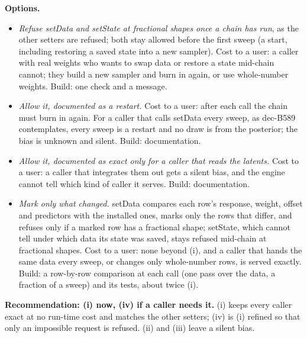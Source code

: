 \textbf{Options.}
\begin{itemize}
\item[(i)] \emph{Refuse setData and setState at fractional shapes once a chain has run}, as the other setters are
refused; both stay allowed before the first sweep (a start, including restoring a saved state into a new
sampler). Cost to a user: a caller with real weights who wants to swap data or restore a state mid-chain cannot;
they build a new sampler and burn in again, or use whole-number weights. Build: one check and a message.
\item[(ii)] \emph{Allow it, documented as a restart.} Cost to a user: after each call the chain must burn in
again. For a caller that calls setData every sweep, as dec-B589 contemplates, every sweep is a restart and no
draw is from the posterior; the bias is unknown and silent. Build: documentation.
\item[(iii)] \emph{Allow it, documented as exact only for a caller that reads the latents.} Cost to a user: a caller
that integrates them out gets a silent bias, and the engine cannot tell which kind of caller it serves. Build:
documentation.
\item[(iv)] \emph{Mark only what changed.} setData compares each row's response, weight, offset and predictors
with the installed ones, marks only the rows that differ, and refuses only if a marked row has a fractional shape;
setState, which cannot tell under which data its state was saved, stays refused mid-chain at fractional shapes.
Cost to a user: none beyond (i), and a caller that hands the same data every sweep, or changes only whole-number
rows, is served exactly. Build: a row-by-row comparison at each call (one pass over the data, a fraction of a
sweep) and its tests, about twice (i).
\end{itemize}

\textbf{Recommendation: (i) now, (iv) if a caller needs it.} (i) keeps every caller exact at no run-time cost and
matches the other setters; (iv) is (i) refined so that only an impossible request is refused. (ii) and (iii) leave
a silent bias.

